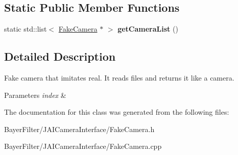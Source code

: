 \subsection*{Static Public Member Functions}
\begin{DoxyCompactItemize}
\item 
\hypertarget{class_j_a_i_1_1_fake_camera_aa4eef701d49719c82f4fde00f2a53c27}{static std\-::list$<$ \hyperlink{class_j_a_i_1_1_fake_camera}{Fake\-Camera} $\ast$ $>$ {\bfseries get\-Camera\-List} ()}\label{class_j_a_i_1_1_fake_camera_aa4eef701d49719c82f4fde00f2a53c27}

\end{DoxyCompactItemize}


\subsection{Detailed Description}
Fake camera that imitates real. It reads files and returns it like a camera. 
\begin{DoxyParams}{Parameters}
{\em index} & \\
\hline
\end{DoxyParams}


The documentation for this class was generated from the following files\-:\begin{DoxyCompactItemize}
\item 
Bayer\-Filter/\-J\-A\-I\-Camera\-Interface/Fake\-Camera.\-h\item 
Bayer\-Filter/\-J\-A\-I\-Camera\-Interface/Fake\-Camera.\-cpp\end{DoxyCompactItemize}

